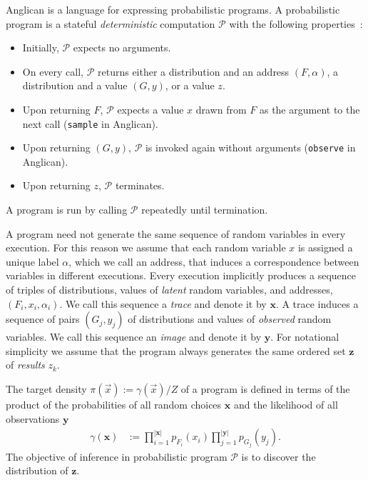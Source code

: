 \documentclass[preprint]{sigplanconf}
\begin{document}
Anglican is a language for expressing probabilistic programs.
A probabilistic program is a stateful \textit{deterministic} computation
$\mathcal{P}$ with the following properties~\cite{TMP+15}:
\begin{itemize}
\item Initially, $\mathcal{P}$ expects no arguments.
\item On every call, $\mathcal{P}$ returns either a distribution
  and an address $(F,\alpha)$, a distribution and a value $(G,
        y)$, or a value $z$.
\item Upon returning $F$, $\mathcal{P}$ expects a value $x$ drawn from $F$ as
	the argument to the next call (\texttt{sample} in Anglican).
\item Upon returning $(G, y)$, $\mathcal{P}$ is invoked again
	without arguments (\texttt{observe} in Anglican).
\item Upon returning $z$, $\mathcal{P}$ terminates.
\end{itemize}
A program is run by calling $\mathcal{P}$ repeatedly until
termination.

A program need not generate the same sequence of random variables in every
execution. For this reason we assume that each random variable $x$ is assigned
a unique label $\alpha$, which we call an address, that induces a
correspondence between variables in different executions. Every execution
implicitly produces a sequence of triples of distributions, values of
\textit{latent} random variables, and addresses, $(F_i, x_i, \alpha_i)$.  We
call this sequence a \textit{trace} and denote it by $\pmb{x}$. A trace induces
a sequence of pairs $(G_j, y_j)$ of distributions and values of
\textit{observed} random variables. We call this sequence an \textit{image} and
denote it by $\pmb{y}$. For notational simplicity we assume that the program
always generates the same ordered set $\pmb{z}$ of \textit{results} $z_k$.

The target density $\pi(\vec{x}) := \gamma(\vec{x}) / Z$ of a program
is defined in terms of the product of the probabilities of all random
choices $\pmb{x}$ and the likelihood of all observations $\pmb{y}$
\begin{align}
  \gamma(\pmb{x}) 
  &:= 
  \prod_{i=1}^{\left|\pmb{x}\right|}
  p_{F_i}(x_i) \prod_{j=1}^{\left|\pmb{y}\right|}p_{G_j}(y_{j}).
  \label{eqn:p-trace}
\end{align}
The objective of inference in probabilistic program $\mathcal{P}$
is to discover the distribution of $\pmb{z}$.
\end{document}
